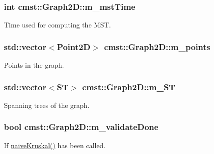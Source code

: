 \subsubsection[{\texorpdfstring{m\+\_\+mst\+Time}{m_mstTime}}]{\setlength{\rightskip}{0pt plus 5cm}int cmst\+::\+Graph2\+D\+::m\+\_\+mst\+Time\hspace{0.3cm}{\ttfamily [private]}}\hypertarget{classcmst_1_1_graph2_d_a447f3d36666c57d2f15bddc1e3126f1e}{}\label{classcmst_1_1_graph2_d_a447f3d36666c57d2f15bddc1e3126f1e}


Time used for computing the M\+ST. 

\subsubsection[{\texorpdfstring{m\+\_\+points}{m_points}}]{\setlength{\rightskip}{0pt plus 5cm}std\+::vector$<${\bf Point2D}$>$ cmst\+::\+Graph2\+D\+::m\+\_\+points\hspace{0.3cm}{\ttfamily [protected]}}\hypertarget{classcmst_1_1_graph2_d_a32456f3c630e34a56ce3109183142c10}{}\label{classcmst_1_1_graph2_d_a32456f3c630e34a56ce3109183142c10}


Points in the graph. 

\subsubsection[{\texorpdfstring{m\+\_\+\+ST}{m_ST}}]{\setlength{\rightskip}{0pt plus 5cm}std\+::vector$<${\bf ST}$>$ cmst\+::\+Graph2\+D\+::m\+\_\+\+ST\hspace{0.3cm}{\ttfamily [protected]}}\hypertarget{classcmst_1_1_graph2_d_a829dc681f90679478b0ba9676af0bc03}{}\label{classcmst_1_1_graph2_d_a829dc681f90679478b0ba9676af0bc03}


Spanning trees of the graph. 

\subsubsection[{\texorpdfstring{m\+\_\+validate\+Done}{m_validateDone}}]{\setlength{\rightskip}{0pt plus 5cm}bool cmst\+::\+Graph2\+D\+::m\+\_\+validate\+Done\hspace{0.3cm}{\ttfamily [private]}}\hypertarget{classcmst_1_1_graph2_d_ae609751f322449c3ac98303a8d6fa747}{}\label{classcmst_1_1_graph2_d_ae609751f322449c3ac98303a8d6fa747}


If \hyperlink{classcmst_1_1_graph2_d_af0db14845e80799be1d4fb15ca230110}{naive\+Kruskal()} has been called. 

